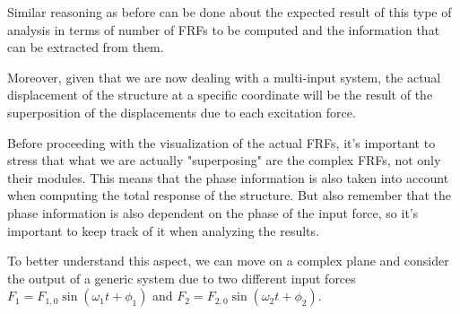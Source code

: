 Similar reasoning as before can be done about the expected result of this type of analysis in terms of number of FRFs to be computed and the information that can be extracted from them.

Moreover, given that we are now dealing with a multi-input system, the actual displacement of the structure at a specific coordinate will be the result of the superposition of the displacements due to each excitation force.

Before proceeding with the visualization of the actual FRFs, it's important to stress that what we are actually "superposing" are the complex FRFs, not only their modules.
This means that the phase information is also taken into account when computing the total response of the structure.
But also remember that the phase information is also dependent on the phase of the input force, so it's important to keep track of it when analyzing the results.

To better understand this aspect, we can move on a complex plane and consider the output of a generic system due to two different input forces $F_1 = F_{1,0} \sin(\omega_1 t + \phi_1)$ and $F_2 = F_{2,0} \sin(\omega_2 t + \phi_2)$.


